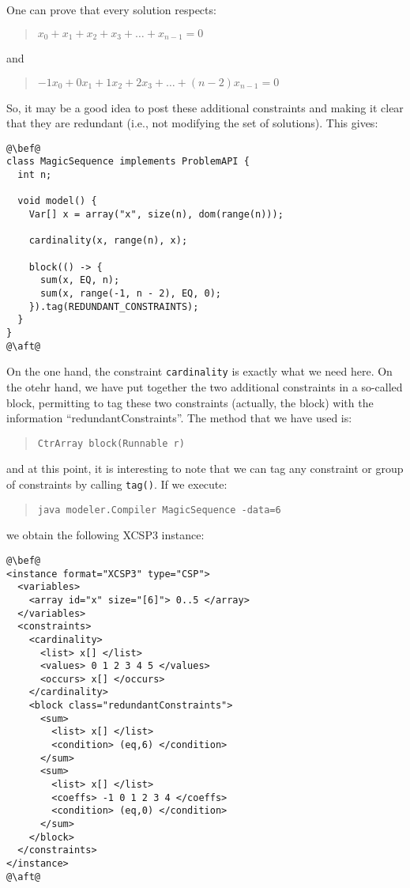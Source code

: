 \documentclass[10pt]{article}
\def\xt{{\rm XCSP3}\xspace}
\newcommand{\gb}[1]{{\tt #1}} %
\newcommand{\nn}[1]{{\tt #1}} %
\def\xt{{\rm XCSP3}\xspace}
\begin{document}
One can prove that every solution respects:
\begin{quote}
  $x_0 + x_1 + x_2 + x_3 + \dots + x_{n-1} = 0$
\end{quote}
and
\begin{quote}
  $-1x_0 + 0x_1 + 1x_2 + 2x_3 + \dots + (n-2)x_{n-1} = 0$
\end{quote}

So, it may be a good idea to post these additional constraints  and making it clear that they are redundant (i.e., not modifying the set of solutions).
This gives:

\begin{lstlisting}
@\bef@
class MagicSequence implements ProblemAPI {
  int n;

  void model() {
    Var[] x = array("x", size(n), dom(range(n)));
    
    cardinality(x, range(n), x);
    
    block(() -> {
      sum(x, EQ, n);
      sum(x, range(-1, n - 2), EQ, 0);
    }).tag(REDUNDANT_CONSTRAINTS);
  }
}
@\aft@
\end{lstlisting}

On the one hand, the constraint \gb{cardinality} is exactly what we need here.
On the otehr hand, we have put together the two additional constraints in a so-called block, permitting to tag these two constraints (actually, the block) with the information ``redundantConstraints''.
The method that we have used is:

\begin{quote}
\begin{verbatim}
CtrArray block(Runnable r) 
\end{verbatim}
\end{quote}

and at this point, it is interesting to note that we can tag any constraint or group of constraints by calling \nn{tag()}.
If we execute:
\begin{quote}
\begin{verbatim}
java modeler.Compiler MagicSequence -data=6
\end{verbatim}
\end{quote}

we obtain the following \xt instance:

\begin{lstlisting}
@\bef@
<instance format="XCSP3" type="CSP">
  <variables>
    <array id="x" size="[6]"> 0..5 </array>
  </variables>
  <constraints>
    <cardinality>
      <list> x[] </list>
      <values> 0 1 2 3 4 5 </values>
      <occurs> x[] </occurs>
    </cardinality>
    <block class="redundantConstraints">
      <sum>
        <list> x[] </list>
        <condition> (eq,6) </condition>
      </sum>
      <sum>
        <list> x[] </list>
        <coeffs> -1 0 1 2 3 4 </coeffs>
        <condition> (eq,0) </condition>
      </sum>
    </block>
  </constraints>
</instance>
@\aft@
\end{lstlisting}
\end{document}
